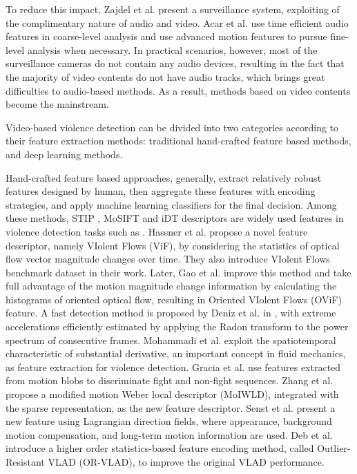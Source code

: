 \documentclass[10pt,twocolumn,letterpaper]{article}
\begin{document}
To reduce this impact, Zajdel et al. \cite{zajdel2007cassandra} present a surveillance system, exploiting of the complimentary nature of audio and video.
Acar et al. \cite{acar2016breaking} use time efficient audio features in coarse-level analysis and use advanced motion features to pursue fine-level analysis when necessary.
In practical scenarios, however, most of the surveillance cameras do not contain any audio devices, resulting in the fact that  the majority of video contents do not have audio tracks, which brings great difficulties to audio-based methods. 
As a result, methods based on video contents become the mainstream. 

Video-based violence detection can be divided into two categories according to their feature extraction methods:
traditional hand-crafted feature based methods, and deep learning methods.

Hand-crafted feature based approaches, generally, extract relatively robust features designed by human, then aggregate these features with encoding strategies, and apply machine learning classifiers for the final decision.
Among these methods, STIP \cite{STIPs}, MoSIFT \cite{MoSIFT} and iDT \cite{iDTs} descriptors are widely used features in violence detection tasks such as \cite{vio_sift, hockey, mosift_sc}.
Hassner et al. \cite{vif} propose a novel feature descriptor, namely VIolent Flows (ViF), by considering the statistics of optical flow vector magnitude changes over time. They also introduce VIolent Flows benchmark dataset in their work.
Later, Gao et al. \cite{ovif} improve this method and take full advantage of the motion magnitude change information by calculating the histograms of oriented optical flow, resulting in Oriented VIolent Flows (OViF) feature.
A fast detection method is proposed by Deniz et al. in \cite{fast}, with extreme accelerations efficiently estimated by applying the Radon transform to the power spectrum of consecutive frames.
Mohammadi et al. \cite{moha_avss} exploit the spatiotemporal characteristic of substantial derivative, an important concept in fluid mechanics, as feature extraction for violence detection.
Gracia et al. \cite{blob} use features extracted from motion blobs to discriminate fight and non-fight sequences. 
Zhang et al. \cite{MoIWLD} propose a modified motion Weber local descriptor (MoIWLD), integrated with the sparse representation, as the new feature descriptor.
Senst et al. \cite{lagrangian} present a new feature using Lagrangian direction fields, where appearance, background motion compensation, and long-term motion information are used.
Deb et al. \cite{vlad} introduce a higher order statistics-based feature encoding method, called Outlier-Resistant VLAD (OR-VLAD), to improve the original VLAD performance.
\end{document}
